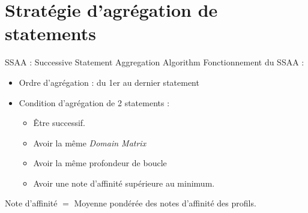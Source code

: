 \documentclass[5pt, compress]{beamer}
\begin{document}
\section{Stratégie d'agrégation de statements}
    \begin{frame}{SSAA : Successive Statement Aggregation Algorithm}
        Fonctionnement du SSAA :
        \vspace{-1em}
        \begin{itemize}
            \item Ordre d'agrégation : du 1er au dernier statement
            \item Condition d'agrégation de 2 statements :
            \pause
                \begin{itemize}
                    \item Être successif.
                    \item Avoir la même \textit{Domain Matrix}
                    \item Avoir la même profondeur de boucle
                    \item Avoir une note d'affinité supérieure au minimum.
                \end{itemize}
        \end{itemize}
        \pause
        
        Note d'affinité $ = $ Moyenne pondérée des notes d'affinité des profils.

    \end{frame}
\end{document}
